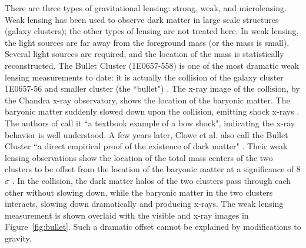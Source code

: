 There are three types of gravitational lensing: strong, weak, and microlensing. Weak lensing has been used to observe dark matter in large scale structures (galaxy clusters); the other types of lensing are not treated here. In weak lensing, the light sources are far away from the foreground mass (or the mass is small). Several light sources are required, and the location of the mass is statistically reconstructed. The Bullet Cluster (1E0657-558) is one of the most dramatic weak lensing measurements to date: it is actually the collision of the galaxy cluster 1E0657-56 and smaller cluster (the ``bullet") \cite{Markevitch2001}. The x-ray image of the collision, by the Chandra x-ray observatory, shows the location of the baryonic matter. The baryonic matter suddenly slowed down upon the collision, emitting shock x-rays  \cite{Markevitch2001}. The authors of \cite{Markevitch2001} call it ``a textbook example of a bow shock", indicating the x-ray behavior is well understood. A few years later, Clowe et al. also call the Bullet Cluster ``a direct empirical proof of the existence of dark matter" \cite{Clowe2006}. Their weak lensing observations show the location of the total mass centers of the two clusters to be offset from the location of the baryonic matter at a significance of 8$\sigma$ \cite{Clowe2006}. In the collision, the dark matter halos of the two clusters pass through each other without slowing down, while the baryonic matter in the two clusters interacts, slowing down dramatically and producing x-rays. The weak lensing measurement is shown overlaid with the visible and x-ray images in Figure~\ref{fig:bullet}. Such a dramatic offset cannot be explained by modifications to gravity.

